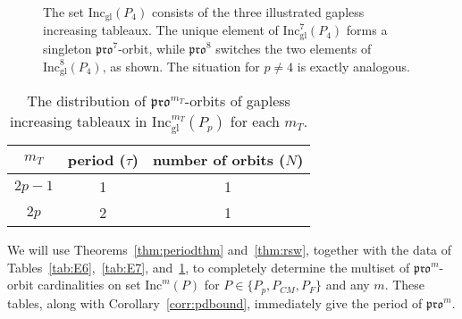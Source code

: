 \documentclass[12pt]{amsart}
\theoremstyle{definition}
\theoremstyle{remark}
\numberwithin{equation}{section}
\newcommand{\inc}{\ensuremath{\mathrm{Inc}}}
\newcommand{\incgl}{\inc_{\mathrm{gl}}}
\newcommand{\pro}{\mathfrak{pro}}
\begin{document}
\begin{figure}[h]
\caption{The set $\incgl(P_4)$ consists of the three illustrated gapless increasing tableaux. The unique element of $\incgl^7(P_4)$ forms a singleton $\pro^7$-orbit, while $\pro^8$ switches the two elements of $\incgl^8(P_4)$, as shown. The situation for $p \neq 4$ is exactly analogous.}\label{fig:propeller_orbits}
\end{figure}

\begin{table}[h]
\begin{tabular}{|c|c|c|}
\hline
$m_T$ & period ($\tau$) & number of orbits ($N$)\\
  \hline
  $2p-1$ & 1 & 1\\
  \hline
  $2p$ & 2 & 1\\ 
  \hline
\end{tabular}
\caption{The distribution of $\pro^{m_T}$-orbits of gapless increasing tableaux in $\incgl^{m_T}(P_p)$ for each ${m_T}$.}
\label{tab:prop}
\end{table}

 
We will use Theorems~\ref{thm:periodthm} and~\ref{thm:rsw}, together with the data of Tables~\ref{tab:E6},~\ref{tab:E7}, and~\ref{tab:prop}, to completely determine the multiset of $\pro^m$-orbit cardinalities on set $\inc^m(P)$ for $P \in \{P_p, P_{CM}, P_F \}$ and any $m$. These tables, along with Corollary~\ref{corr:pdbound}, immediately give the period of $\pro^m$.
\end{document}
